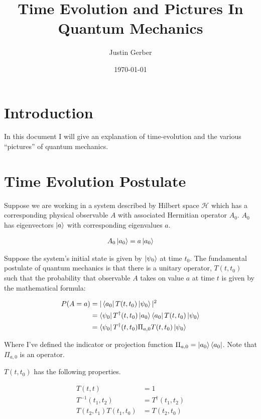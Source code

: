 \documentclass[12pt]{article}
\begin{document}
\title{Time Evolution and Pictures In Quantum Mechanics}
\author{Justin Gerber}
\date{\today}
\maketitle

\section{Introduction}

In this document I will give an explanation of time-evolution and the various ``pictures'' of quantum mechanics.

\section{Time Evolution Postulate}

Suppose we are working in a system described by Hilbert space $\mathcal{H}$ which has a corresponding physical observable $A$ with associated Hermitian operator $A_0$. $A_0$ has eigenvectors $\ket{a}$ with corresponding eigenvalues $a$. 

\begin{align}
A_0\ket{a_0} = a \ket{a_0}
\end{align}

Suppose the system's initial state is given by $\ket{\psi_0}$ at time $t_0$. The fundamental postulate of quantum mechanics is that there is a unitary operator, $T(t,t_0)$ such that the probability that observable $A$ takes on value $a$ at time $t$ is given by the mathematical formula:

\begin{align}
P(A=a) &= |\bra{a_0}T(t,t_0)\ket{\psi_0}|^2\\
&= \bra{\psi_0} T^{\dag}(t,t_0) \ket{a_0}\bra{a_0}T(t,t_0)\ket{\psi_0}\\
&= \bra{\psi_0} T^{\dag}(t,t_0) \Pi_{a,0} T(t,t_0) \ket{\psi_0}
\end{align}

Where I've defined the indicator or projection function $\Pi_{a,0} = \ket{a_0}\bra{a_0}$. Note that $\Pi_{a,0}$ is an operator.

$T(t,t_0)$ has the following properties.

\begin{align}
T(t,t) &= 1\\
T^{-1}(t_1,t_2) &= T^{\dag}(t_1,t_2)\\
T(t_2,t_1)T(t_1,t_0) &= T(t_2,t_0)
\end{align}
\end{document}

